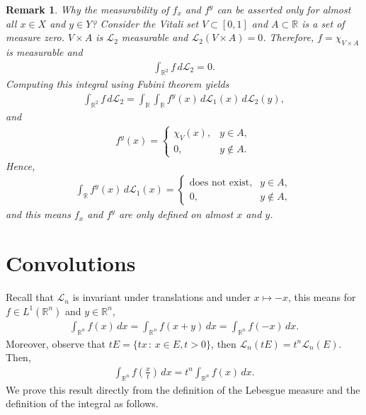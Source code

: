 \documentclass[11pt]{book}
\newtheorem{remark}{Remark}[chapter]
\theoremstyle{definition}
\numberwithin{equation}{chapter}
\def\L{{\mathcal L}}
\begin{document}
\medskip

\begin{remark}
Why the measurability of $f_x$ and $f^y$ can be asserted only for almost all $x \in X$ and $y \in Y$? Consider the Vitali set $V \subset [0,1]$ and $A \subset \mathbb{R}$ is a set of measure zero. $V \times A$ is $\L_2$ measurable and $\L_2(V \times A) = 0$. Therefore, $f = \chi_{V \times A}$ is measurable and
\begin{align*}
    \int_{\mathbb{R}^2} f\,d\L_2 = 0.
\end{align*}
Computing this integral using Fubini theorem yields
\begin{align*}
    \int_{\mathbb{R}^2} f\,d\L_2 = \int_{\mathbb{R}} \int_{\mathbb{R}} f^y(x)\, d\L_1(x) \, d\L_2(y),
\end{align*}
and 
\begin{align*}
    f^y(x) = \begin{cases}
        \chi_V(x), & y \in A, \\
        0, & y \notin A.
    \end{cases}
\end{align*}
Hence,
\begin{align*}
    \int_{\mathbb{R}} f^y(x)\, d\L_1(x) = \begin{cases}
        \text{does not exist}, & y \in A, \\
        0, & y \notin A,
    \end{cases}
\end{align*}
and this means $f_x$ and $f^y$ are only defined on almost $x$ and $y$.
\end{remark}

\medskip


\section{Convolutions}

Recall that $\L_n$ is invariant under translations and under $x \mapsto -x$, this means for $f \in L^1(\mathbb{R}^n)$ and $y \in \mathbb{R}^n$,
\begin{align*}
    \int_{\mathbb{R}^n} f(x) \,dx = \int_{\mathbb{R}^n} f(x + y) \,dx = \int_{\mathbb{R}^n} f(-x) \,dx.
\end{align*}
Moreover, observe that $tE = \{tx \,:\, x \in E, t > 0\}$, then $\L_n(tE) = t^n \L_n(E)$. Then,
\begin{align*}
    \int_{\mathbb{R}^n} f\left(\frac{x}{t}\right) \,dx = t^n \int_{\mathbb{R}^n} f(x) \,dx.
\end{align*}
We prove this result directly from the definition of the Lebesgue measure and the definition of the integral as follows.
\end{document}
